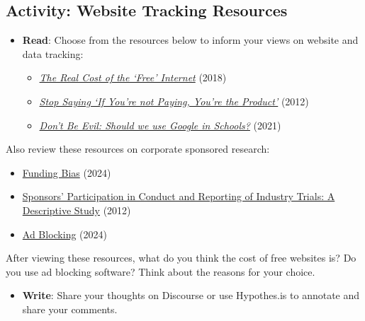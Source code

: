 \documentclass[
  letterpaper,
  DIV=11,
  numbers=noendperiod]{scrreprt}
\providecommand{\tightlist}{%
  \setlength{\itemsep}{0pt}\setlength{\parskip}{0pt}}\usepackage{longtable,booktabs,array}
\begin{document}
\subsection{Activity: Website Tracking
Resources}\label{activity-website-tracking-resources}

\begin{tcolorbox}[enhanced jigsaw, toprule=.15mm, colback=white, colframe=quarto-callout-note-color-frame, bottomtitle=1mm, leftrule=.75mm, coltitle=black, titlerule=0mm, rightrule=.15mm, colbacktitle=quarto-callout-note-color!10!white, left=2mm, title={Learning Activity}, opacitybacktitle=0.6, opacityback=0, breakable, toptitle=1mm, arc=.35mm, bottomrule=.15mm]

\begin{itemize}
\tightlist
\item
  \textbf{Read}: Choose from the resources below to inform your views on
  website and data tracking:

  \begin{itemize}
  \tightlist
  \item
    \href{http://mediashift.org/2018/01/real-cost-free-internet/}{\emph{The
    Real Cost of the `Free' Internet}} (2018)
  \item
    \href{https://www.techdirt.com/2012/12/20/stop-saying-if-youre-not-paying-youre-product/}{\emph{Stop
    Saying `If You're not Paying, You're the Product'}} (2012)
  \item
    \href{https://link.springer.com/article/10.1007/s11528-021-00599-4}{\emph{Don't
    Be Evil: Should we use Google in Schools?}} (2021)
  \end{itemize}
\end{itemize}

Also review these resources on corporate sponsored research:

\begin{itemize}
\tightlist
\item
  \href{https://en.wikipedia.org/wiki/Funding_bias}{Funding Bias} (2024)
\item
  \href{https://trialsjournal.biomedcentral.com/articles/10.1186/1745-6215-13-146}{Sponsors'
  Participation in Conduct and Reporting of Industry Trials: A
  Descriptive Study} (2012)
\item
  \href{https://en.wikipedia.org/wiki/Ad_blocking}{Ad Blocking} (2024)
\end{itemize}

After viewing these resources, what do you think the cost of free
websites is? Do you use ad blocking software? Think about the reasons
for your choice.

\begin{itemize}
\tightlist
\item
  \textbf{Write}: Share your thoughts on Discourse or use Hypothes.is to
  annotate and share your comments.
\end{itemize}

\end{tcolorbox}
\end{document}
